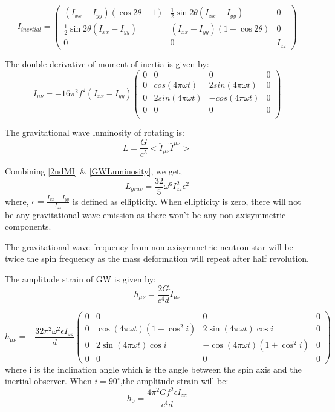 \documentclass{ttuthes2007}
\begin{document}
\begin{equation}
I_{inertial}=
\begin{pmatrix}
(I_{xx}-I_{yy})(\cos2\theta -1) & \frac{1}{2}\sin2\theta(I_{xx}-I_{yy}) & 0 \\
\frac{1}{2}\sin2\theta(I_{xx}-I_{yy}) & (I_{xx}-I_{yy})(1-\cos2\theta) & 0  \\
0 & 0 & I_{zz}
\end{pmatrix}
\end{equation}

The double derivative of moment of inertia is given by:
\begin{equation} \label{2ndMI}
I_{\mu\nu}=-16\pi ^2f^2(I_{xx}-I_{yy})
\begin{pmatrix}
0 & 0 & 0 & 0 \\
0 & cos(4\pi\omega t) & 2sin(4\pi\omega t) & 0 \\
0 & 2sin(4\pi\omega t) & -cos(4\pi\omega t) & 0 \\
0 & 0 & 0 & 0 \\
\end{pmatrix}
\end{equation}

The gravitational wave luminosity of rotating is:
\begin{equation}\label{GWLuminosity}
L= \frac{G}{c^5}<\dddot{I}_{\mu\nu}\dddot{I}^{\mu\nu}>
\end{equation}

Combining \ref{2ndMI} \& \ref{GWLuminosity}, we get,
\begin{equation}\label{Lgw}
L_{grav}= \frac{32}{5}\omega ^6 I_{zz}^2\epsilon ^2
\end{equation}
where, $\epsilon =\frac{I_{xx}-I_{yy}}{I_{zz}}$ is defined as ellipticity. When
ellipticity is zero, there will not be any gravitational wave emission as there
won't be any non-axisymmetric components.

The gravitational wave frequency from non-axisymmetric neutron star will be
twice the spin frequency as the mass deformation will repeat after half
revolution.

The amplitude strain of \ac{GW} is given by:
\begin{equation}
h_{\mu\nu}=\frac{2G}{c^4d}\ddot{I}_{\mu\nu}
\end{equation}


\begin{equation} \label{2ndMI}
h_{\mu\nu}=-\frac{32\pi ^2\omega^2 \epsilon I_{zz}}{d}
\begin{pmatrix}
0 & 0 & 0 & 0 \\
0 & \cos(4\pi \omega t)(1+\cos ^2i) & 2\sin(4\pi \omega t)\cos i & 0 \\
0 & 2\sin(4\pi\omega t)\cos i & -\cos(4\pi\omega t)(1+\cos ^2i) & 0 \\
0 & 0 & 0 & 0 
\end{pmatrix}
\end{equation}
where i is the inclination angle which is the angle between the spin axis and
the inertial observer. When $i=90^\circ$,the amplitude strain will be:
\begin{equation}
h_0=\frac{4\pi ^2Gf^2 \epsilon I_{zz}}{c^4d}
\end{equation}
\end{document}
